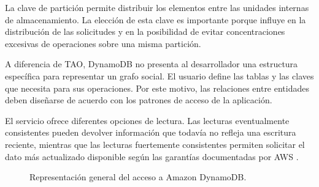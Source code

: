 \documentclass[12pt,a4paper]{article}
\begin{document}
La clave de partición permite distribuir los elementos entre las unidades internas de almacenamiento. La elección de esta clave es importante porque influye en la distribución de las solicitudes y en la posibilidad de evitar concentraciones excesivas de operaciones sobre una misma partición.

A diferencia de TAO, DynamoDB no presenta al desarrollador una estructura específica para representar un grafo social. El usuario define las tablas y las claves que necesita para sus operaciones. Por este motivo, las relaciones entre entidades deben diseñarse de acuerdo con los patrones de acceso de la aplicación.

El servicio ofrece diferentes opciones de lectura. Las lecturas eventualmente consistentes pueden devolver información que todavía no refleja una escritura reciente, mientras que las lecturas fuertemente consistentes permiten solicitar el dato más actualizado disponible según las garantías documentadas por AWS \cite{awsdynamodbconsistency}.

\begin{figure}[H]
\centering
{}
\caption{Representación general del acceso a Amazon DynamoDB.}
\label{fig:dynamodb}
\end{figure}
\end{document}

